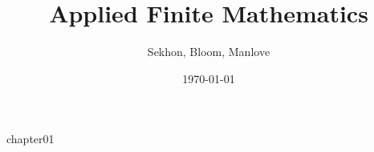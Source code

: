 \documentclass[12pt]{book}
\begin{document}
\frontmatter
\title{Applied Finite Mathematics}
\author{Sekhon, Bloom, Manlove}
\date{\today}
\maketitle
\tableofcontents

\mainmatter
{chapter01}
% 

\backmatter
\end{document}
